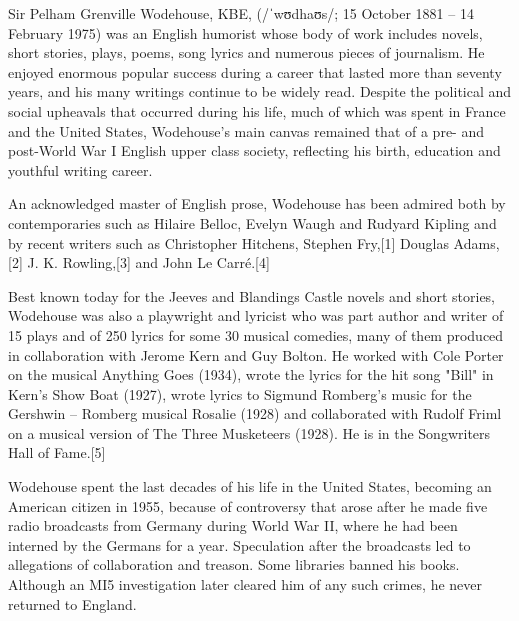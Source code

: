 Sir Pelham Grenville Wodehouse, KBE, (/ˈwʊdhaʊs/; 15 October 1881 – 14
February 1975) was an English humorist whose body of work includes
novels, short stories, plays, poems, song lyrics and numerous pieces
of journalism. He enjoyed enormous popular success during a career
that lasted more than seventy years, and his many writings continue to
be widely read. Despite the political and social upheavals that
occurred during his life, much of which was spent in France and the
United States, Wodehouse's main canvas remained that of a pre- and
post-World War I English upper class society, reflecting his birth,
education and youthful writing career.

An acknowledged master of English prose, Wodehouse has been admired
both by contemporaries such as Hilaire Belloc, Evelyn Waugh and
Rudyard Kipling and by recent writers such as Christopher Hitchens,
Stephen Fry,[1] Douglas Adams,[2] J. K. Rowling,[3] and John Le
Carré.[4]

Best known today for the Jeeves and Blandings Castle novels and short
stories, Wodehouse was also a playwright and lyricist who was part
author and writer of 15 plays and of 250 lyrics for some 30 musical
comedies, many of them produced in collaboration with Jerome Kern and
Guy Bolton. He worked with Cole Porter on the musical Anything Goes
(1934), wrote the lyrics for the hit song "Bill" in Kern's Show Boat
(1927), wrote lyrics to Sigmund Romberg's music for the Gershwin –
Romberg musical Rosalie (1928) and collaborated with Rudolf Friml on a
musical version of The Three Musketeers (1928). He is in the
Songwriters Hall of Fame.[5]

Wodehouse spent the last decades of his life in the United States,
becoming an American citizen in 1955, because of controversy that
arose after he made five radio broadcasts from Germany during World
War II, where he had been interned by the Germans for a
year. Speculation after the broadcasts led to allegations of
collaboration and treason. Some libraries banned his books. Although
an MI5 investigation later cleared him of any such crimes, he never
returned to England.


